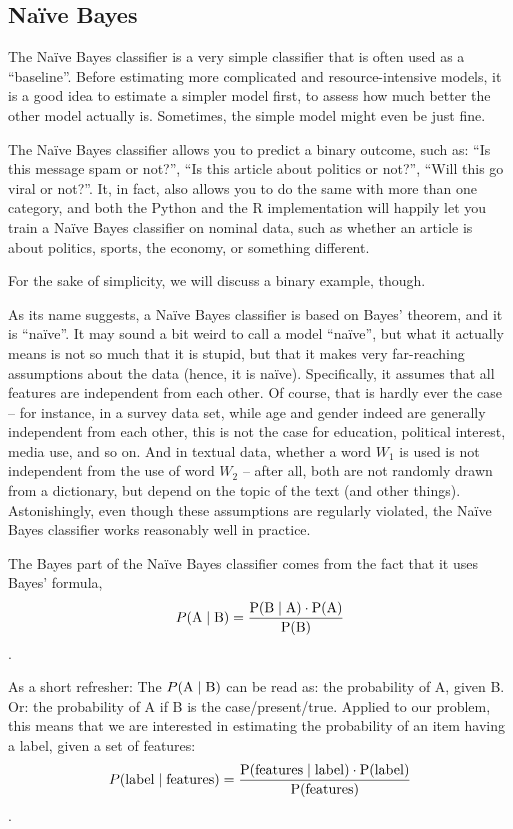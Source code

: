 \subsection{Na\"ive Bayes}
\label{subsec:Na\"ive Bayes}

The Na\"ive Bayes classifier is a very simple classifier that is often
used as a ``baseline''. Before estimating more complicated and
resource-intensive models, it is a good idea to estimate a simpler
model first, to assess how much better the other model actually
is. Sometimes, the simple model might even be just fine.

The Na\"ive Bayes classifier allows you to predict a binary outcome,
such as: ``Is this message spam or not?'', ``Is this article about
politics or not?'', ``Will this go viral or not?''.  It, in fact, also
allows you to do the same with more than one category, and both the
Python and the R implementation will happily let you train a Na\"ive
Bayes classifier on nominal data, such as whether an article is about
politics, sports, the economy, or something different.

For the sake of simplicity, we will discuss a binary example, though.

As its name suggests, a Na\"ive Bayes classifier is based on Bayes'
theorem, and it is ``na\"ive''.  It may sound a bit weird to call a
model ``na\"ive'', but what it actually means is not so much that it
is stupid, but that it makes very far-reaching assumptions about the
data (hence, it is na\"ive). Specifically, it assumes that all
features are independent from each other.  Of course, that is hardly
ever the case -- for instance, in a survey data set, while age and
gender indeed are generally independent from each other, this is not the case for education, political interest,
media use, and so on.  And in textual data, whether a word $W_1$ is used
is not independent from the use of word $W_2$ -- after all, both are not
randomly drawn from a dictionary, but depend on the topic of the text
(and other things).  Astonishingly, even though these assumptions are
regularly violated, the Na\"ive Bayes classifier works reasonably well
in practice.

The Bayes part of the Na\"ive Bayes classifier comes from the fact
that it uses Bayes' formula, $$ P(\rm{A} \mid \rm{B}) = \frac{P(\rm{B} \mid \rm{A}) \cdot P(\rm{A})}{P(\rm {B})} $$.

As a short refresher: The $P(\rm{A} \mid \rm{B})$ can be read as: the
probability of A, given B. Or: the probability of A if B is the
case/present/true.  Applied to our problem, this means that we are
interested in estimating the probability of an item having a label,
given a set of features:
$$ P(\rm{label} \mid \rm{features}) = \frac{P(\rm{features} \mid \rm{label}) \cdot P(\rm{label})}{P(\rm{features})} $$.

